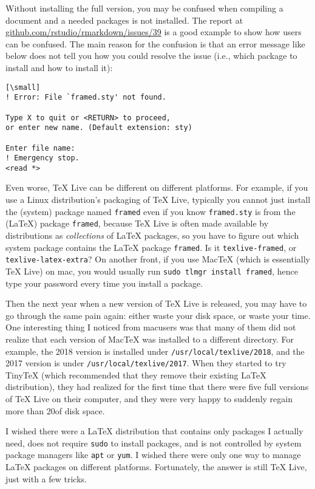 \documentclass{tugboat}
\def\macOS{mac\acro{OS}}
\def\GB{\acro{GB}}
\begin{document}
Without installing the full version, you may be confused when compiling
a document and a needed packages is not installed. The report at
\url{github.com/rstudio/rmarkdown/issues/39} is a good example
to show how users can be confused. The main reason for the confusion is
that an error message like below does not tell you how you could resolve
the issue (i.e., which package to install and how to install it):

\begin{verbatim}[\small]
! Error: File `framed.sty' not found.

Type X to quit or <RETURN> to proceed,
or enter new name. (Default extension: sty)

Enter file name: 
! Emergency stop.
<read *> 
\end{verbatim}

Even worse, \TeX{} Live can be different on different platforms. For
example, if you use a Linux distribution's packaging of \TeX{} Live,
typically you cannot just install the (system) package named
\texttt{framed} even if you know \texttt{framed.sty} is from the (\LaTeX{})
package \texttt{framed}, because \TeX{} Live is often made available by
distributions as \emph{collections} of \LaTeX{} packages, so you have to
figure out which system package contains the \LaTeX{} package
\texttt{framed}. Is it \texttt{texlive-framed}, or
\texttt{texlive-latex-extra}? On another front, if you use MacTeX (which
is essentially \TeX{} Live) on \macOS, you would usually run
\texttt{sudo\ tlmgr\ install\ framed}, hence type your password every
time you install a package.

Then the next year when a new version of \TeX{} Live is released, you may
have to go through the same pain again: either waste your disk space, or
waste your time. One interesting thing I noticed from \macOS users was
that many of them did not realize that each version of MacTeX was
installed to a different directory. For example, the 2018 version is
installed under \texttt{/usr/local/texlive/2018}, and the 2017 version
is under \texttt{/usr/local/texlive/2017}. When they started to try
TinyTeX (which recommended that they remove their existing \LaTeX{}
distribution), they had realized for the first time that there were five
full versions of \TeX{} Live on their computer, and they were very happy to
suddenly regain more than 20\GB of disk space.

I wished there were a \LaTeX{} distribution that contains only packages I
actually need, does not require \texttt{sudo} to install packages, and
is not controlled by system package managers like \texttt{apt} or
\texttt{yum}. I wished there were only one way to manage \LaTeX{} packages
on different platforms. Fortunately, the answer is still \TeX{} Live, just
with a few tricks.
\end{document}
